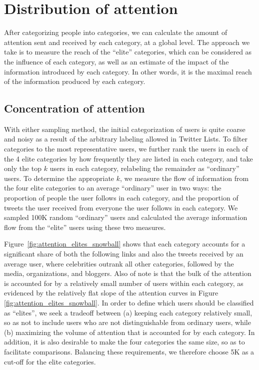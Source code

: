 \documentclass[phd,tocprelim]{cornell}
\begin{document}
\section{Distribution of attention}

After categorizing people into categories, we can calculate the amount of attention sent and received by each category, at a global level. The approach we take is to measure the reach of the ``elite'' categories, which can be considered as the influence of each category, as well as an estimate of the impact of the information introduced by each category. In other words, it is the maximal reach of the information produced by each category.


\subsection{Concentration of attention}
\label{sec:attention}
With either sampling method, the initial categorization of users is quite
coarse and noisy as a result of the arbitrary labeling allowed in Twitter
Lists.  To filter categories to the most representative users, we further
rank the users in each of the 4 elite categories by how frequently they are
listed in each category, and take only the top $k$ users in each category,
relabeling the remainder as ``ordinary'' users. To determine the
appropriate $k$, we measure the flow of information from the four elite
categories to an average ``ordinary'' user in two ways: the proportion of
people the user follows in each category, and the proportion of tweets the
user received from everyone the user follows in each category.  We sampled
100K random ``ordinary'' users and calculated the average information flow
from the ``elite'' users using these two measures.

Figure~\ref{fig:attention_elites_snowball} shows that each category
accounts for a significant share of both the following links and also the
tweets received by an average user, where celebrities outrank all other
categories, followed by the media, organizations, and bloggers.  Also of
note is that the bulk of the attention is accounted for by a relatively
small number of users within each category, as evidenced by the relatively
flat slope of the attention curves in Figure
\ref{fig:attention_elites_snowball}. In order to define which users should
be classified as ``elites'', we seek a tradeoff between (a) keeping each
category relatively small, so as not to include users who are not
distinguishable from ordinary users, while (b) maximizing the volume of
attention that is accounted for by each category. In addition, it is also
desirable to make the four categories the same size, so as to facilitate
comparisons.  Balancing these requirements, we therefore choose 5K as a
cut-off for the elite categories.
\end{document}
